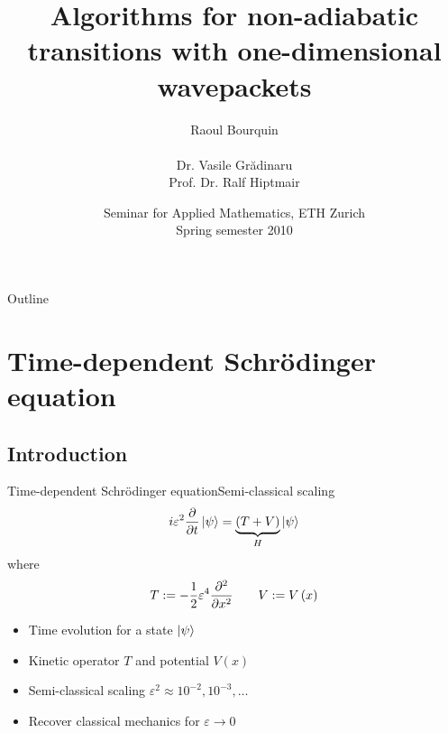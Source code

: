 \documentclass{beamer}
\title[Wavepackets]{Algorithms for non-adiabatic transitions
  with one-dimensional wavepackets}
\author[]{Raoul Bourquin\\~\\ Dr. Vasile Gr\u{a}dinaru\\ Prof. Dr. Ralf Hiptmair}
\date{Seminar for Applied Mathematics, ETH Zurich \\Spring semester 2010}
\begin{document}
\begin{frame}
  \titlepage
\end{frame}


\begin{frame}{Outline}
  \tableofcontents
\end{frame}


\section{Time-dependent Schrödinger equation}
\subsection{Introduction}


\begin{frame}{Time-dependent Schrödinger equation}{Semi-classical scaling}
  \begin{equation*} \label{eq:basics_tdse_semi}
    i \varepsilon^2 \frac{\partial}{\partial t} \Ket{\psi} = \underbrace{\left(T+V\right)}_{H} \Ket{\psi}
  \end{equation*}
  where
  \begin{equation*}
    T := - \frac{1}{2} \varepsilon^4 \frac{\partial^2}{\partial x^2} \qquad
    V := V\left( x \right)
  \end{equation*}
  \begin{itemize}
  \item Time evolution for a state $\Ket{\psi}$
  \item Kinetic operator $T$ and potential $V\left( x \right)$
  \item Semi-classical scaling $\varepsilon^2 \approx 10^{-2}, 10^{-3}, \ldots$
  \item Recover classical mechanics for $\varepsilon \rightarrow 0$
  \end{itemize}
\end{frame}
\end{document}
